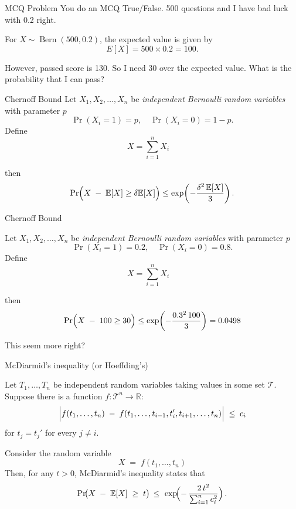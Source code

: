 \documentclass[aspectratio=169, handout]{beamer}
\begin{document}
\begin{frame}{MCQ Problem}
   You do an MCQ True/False. 500 questions and I have bad luck with 0.2 right.   

   For \( X \sim \operatorname{Bern}(500,0.2) \), the expected value is given by
\[
E[X] = 500 \times 0.2 = 100.
\]
   
   However, passed score is 130. So I need 30 over the expected value. What is the probability that I can pass? 
\end{frame}
\begin{frame}{Chernoff Bound}
    Let \(X_1, X_2, \dots, X_n\) be \emph{independent Bernoulli random variables} with parameter \(p\)
      \[
      \Pr(X_i = 1) = p, \quad \Pr(X_i = 0) = 1-p.
      \]
    Define
      \[
      X= \sum_{i=1}^{n} X_i\quad 
      \]

  then 
  \[
  \Pr\Bigl(  X \;-\; \mathbb{E}[X] \ge  \delta \mathbb{E} [X]\Bigr) \le \exp\!\left(-\frac{\delta^2 \, \mathbb{E} [X]}{3}\right).
  \]
  
\end{frame}

\begin{frame}{Chernoff Bound}

    Let \(X_1, X_2, \dots, X_n\) be \emph{independent Bernoulli random variables} with parameter \(p\)
      \[
      \Pr(X_i = 1) = 0.2, \quad \Pr(X_i = 0) = 0.8.
      \]
    Define
      \[
      X= \sum_{i=1}^{n} X_i\quad 
      \]

  then 
  \[
  \Pr\Bigl(  X \;-\; 100 \ge  30 \Bigr) \le \exp\!\left(-\frac{0.3^2 \, 100}{3}\right) = 0.0498
  \]

This seem more right?   
\end{frame}

\begin{frame}{McDiarmid's inequality}
(or Hoeffding's)

    Let $T_1,\dots,T_n$ be independent random variables taking values in some set $\mathcal{T}$. 
    Suppose there is a function $f:\mathcal{T}^n \to \mathbb{R}$:
    \[
    \Bigl| f(t_1,\dots,t_n) 
          \;-\; f(t_1,\dots,t_{i-1},t_i',t_{i+1},\dots,t_n) 
    \Bigr| \;\le\; c_i 
    \]
    for $t_j = t_j'$ for every $j \neq i.$ 
    
    
    \medskip
    
    \noindent
    Consider the random variable
    \[
    X \;=\;f(t_1,\dots,t_n)
    \]
    Then, for any $t > 0$, McDiarmid's inequality states that
    \[
    \Pr\!\bigl(  X \;-\; \mathbb{E}[X] \;\ge\; t \bigr)
    \,\le\, 
     \,\exp\!\Bigl(-\,\frac{2\,t^2}{\sum_{i=1}^n c_i^2}\Bigr)\,.
    \]
\end{frame}
\end{document}

